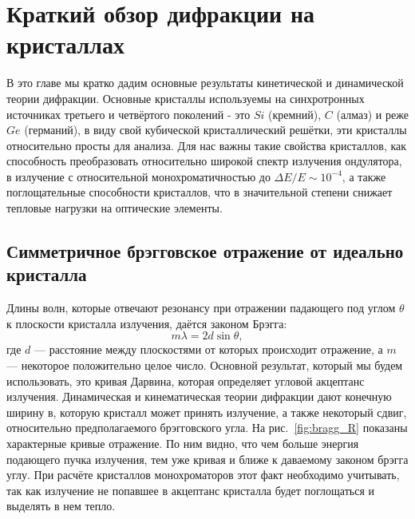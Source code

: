 \chapter{Краткий обзор дифракции на кристаллах}
В это главе мы кратко дадим основные результаты кинетической и динамической теории дифракции. Основные кристаллы используемы на синхротронных источниках третьего и четвёртого поколений - это $Si$ (кремний), $C$ (алмаз) и реже $Ge$ (германий), в виду свой кубической кристаллический решётки, эти кристаллы относительно просты для анализа. Для нас важны такие свойства кристаллов, как способность преобразовать относительно широкой спектр излучения ондулятора, в излучение с относительной монохроматичностью до $\Delta E/ E \sim 10^{-4}$, а также поглощательные способности кристаллов, что в значительной степени снижает тепловые нагрузки на оптические элементы.
\section{Симметричное брэгговское отражение от идеально кристалла}
Длины волн, которые отвечают резонансу при отражении падающего под углом $\theta$ к плоскости кристалла излучения, даётся законом Брэгга:  
\begin{equation}
	m\lambda = 2d\sin\theta,
\end{equation}
где $d$ --- расстояние между плоскостями от которых происходит отражение, а $m$ --- некоторое положительно целое число. Основной результат, который мы будем использовать, это кривая Дарвина, которая определяет угловой акцептанс излучения. Динамическая и кинематическая теории дифракции дают конечную ширину в, которую кристалл может принять излучение, а также некоторый сдвиг, относительно предполагаемого брэгговского угла. На рис.~\ref{fig:bragg_R} показаны характерные кривые отражение. По ним видно, что чем больше энергия подающего пучка излучения, тем уже кривая и ближе к даваемому законом брэгга углу. При расчёте кристаллов монохроматоров этот факт необходимо учитывать, так как излучение не попавшее в акцептанс кристалла будет поглощаться и выделять в нем тепло. 
